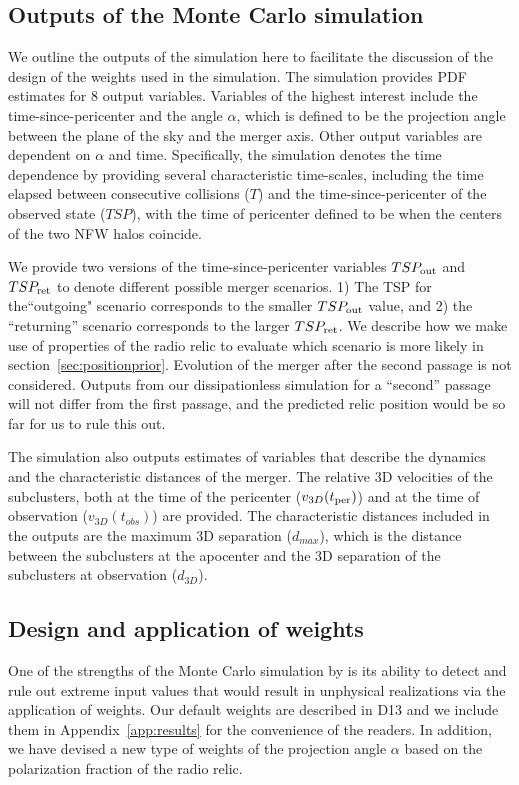 \documentclass[letterpaper,useAMS,usenatbib]{mn2e}
\begin{document}
\subsection{Outputs of the Monte Carlo simulation}\label{sec:outputs}
We outline the outputs of the simulation here to facilitate the discussion
of the design of the weights used in the simulation. The simulation
provides PDF estimates for 8 output variables. Variables
of the highest interest include the time-since-pericenter and the angle $\alpha$, which is
defined to be the projection angle between the plane of the sky and the
merger axis. Other output variables are dependent on $\alpha$ and time. Specifically, the simulation denotes the time dependence by
providing several characteristic time-scales, including the time
elapsed between consecutive collisions
($T$) and the time-since-pericenter of the observed state ($TSP$), with the
time of pericenter defined to be when the centers of the two NFW halos coincide. 
\par
We provide two versions of the time-since-pericenter variables $TSP_{\rm out}$ and
$TSP_{\rm ret}$ to denote different possible merger scenarios. 
1) The TSP for the``outgoing" scenario corresponds to the
smaller $TSP_{\rm out}$ value, and 2) the ``returning'' scenario 
corresponds to the larger $TSP_{\rm ret}$.
We describe how we make use of properties of the radio relic to evaluate
which scenario is more likely in
section~\ref{sec:positionprior}. Evolution of the merger after the second
passage is not considered. Outputs from our dissipationless simulation for
a ``second'' passage will not differ from the first passage, and the
predicted relic position would be so far for us to rule this out.
 
The simulation also outputs estimates of variables that describe
the dynamics and the characteristic distances of the merger. The relative
3D velocities of the subclusters, both at the time of the
pericenter ($v_{3D}(t_{\rm per})$) and at the time of observation
($v_{3D}(t_{obs})$) are provided. The characteristic
distances included in the outputs are the maximum 3D separation ($d_{max}$),
which is the distance between the subclusters at
the apocenter and the 3D separation of the subclusters at observation
($d_{3D}$). 
\subsection{Design and application of weights} 
\label{sec:priors}
%
One of the strengths of the Monte Carlo simulation by
 is its ability to detect and rule out extreme input values that would result in
unphysical realizations via the application of weights. 
Our default weights are described in D13 and we include them in
Appendix~\ref{app:results} for the convenience of the readers. 
In addition, we have devised a new type of weights of the projection angle $\alpha$
based on the polarization fraction of the radio relic.
\end{document}
